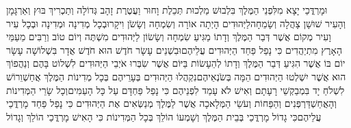 \documentclass[../main/main.tex]{subfiles}
\begin{document}
\begin{multicols*}{\ncols}
וּמָרְדֳּכַי יָצָא מִלִּפְנֵי הַמֶּלֶךְ בִּלְבוּשׁ מַלְכוּת תְּכֵלֶת וָחוּר וַעֲטֶרֶת זָהָב גְּדוֹלָה וְתַכְרִיךְ בּוּץ וְאַרְגָּמָן וְהָעִיר שׁוּשָׁן צָהֲלָה וְשָׂמֵחָה\PreVerseSpace{}לַיְּהוּדִים הָיְתָה אוֹרָה וְשִׂמְחָה וְשָׂשֹׂן וִיקָר\PreVerseSpace{}וּבְכָל מְדִינָה וּמְדִינָה וּבְכָל עִיר וָעִיר מְקוֹם אֲשֶׁר דְּבַר הַמֶּלֶךְ וְדָתוֹ מַגִּיעַ שִׂמְחָה וְשָׂשׂוֹן לַיְּהוּדִים מִשְׁתֶּה וְיוֹם טוֹב וְרַבִּים מֵעַמֵּי הָאָרֶץ מִתְיַהֲדִים כִּי נָפַל פַּחַד הַיְּהוּדִים עֲלֵיהֶם\PreChapterSpace{}וּבִשְׁנֵים עָשָׂר חֹדֶשׁ הוּא חֹדֶשׁ אֲדָר בִּשְׁלוֹשָׁה עָשָׂר יוֹם בּוֹ אֲשֶׁר הִגִּיעַ דְּבַר הַמֶּלֶךְ וְדָתוֹ לְהֵעָשׂוֹת בַּיּוֹם אֲשֶׁר שִׂבְּרוּ אֹיְבֵי הַיְּהוּדִים לִשְׁלוֹט בָּהֶם וְנַהֲפוֹךְ הוּא אֲשֶׁר יִשְׁלְטוּ הַיְּהוּדִים הֵמָּה בְּשֹׂנְאֵיהֶם\PreVerseSpace{}נִקְהֲלוּ הַיְּהוּדִים בְּעָרֵיהֶם בְּכָל מְדִינוֹת הַמֶּלֶךְ אֲחַשְׁוֵרוֹשׁ לִשְׁלֹחַ יָד בִּמְבַקְשֵׁי רָעָתָם וְאִישׁ לֹא עָמַד לִפְנֵיהֶם כִּי נָפַל פַּחְדָּם עַל כָּל הָעַמִּים\PreVerseSpace{}וְכָל שָׂרֵי הַמְּדִינוֹת וְהָאֲחַשְׁדַּרְפְּנִים וְהַפַּחוֹת וְעֹשֵׂי הַמְּלָאכָה אֲשֶׁר לַמֶּלֶךְ מְנַשְּׂאִים אֶת הַיְּהוּדִים כִּי נָפַל פַּחַד מָרְדֳּכַי עֲלֵיהֶם\PreVerseSpace{}כִּי גָדוֹל מָרְדֳּכַי בְּבֵית הַמֶּלֶךְ וְשָׁמְעוֹ הוֹלֵךְ בְּכָל הַמְּדִינוֹת כִּי הָאִישׁ מָרְדֳּכַי הוֹלֵךְ וְגָדוֹל\OpenSection{}\par

\end{multicols*}
\end{document}

